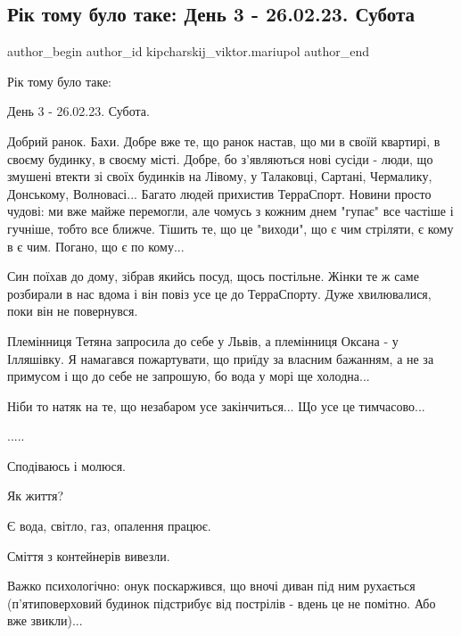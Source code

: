  
 
 
 
 

\subsection{Рік тому було таке: День 3 - 26.02.23. Субота}
\label{sec:26_02_2023.fb.kipcharskij_viktor.mariupol.1.r_k_tomu_bulo_take__}

\ifcmt
 author_begin
   author_id kipcharskij_viktor.mariupol
 author_end
\fi

Рік тому було таке:

День 3 - 26.02.23. Субота.

Добрий ранок. Бахи. Добре вже те, що ранок настав, що ми в своїй квартирі, в
своєму будинку, в своєму місті. Добре, бо з'являються нові сусіди - люди, що
змушені втекти зі своїх будинків на Лівому, у Талаковці, Сартані, Чермалику,
Донському, Волновасі... Багато людей прихистив ТерраСпорт. Новини просто
чудові: ми вже майже перемогли, але чомусь з кожним днем "гупає" все частіше і
гучніше, тобто все ближче. Тішить те, що це "виходи", що є чим стріляти, є кому
в є чим. Погано, що є по кому...

Син поїхав до дому, зібрав якийсь посуд, щось постільне. Жінки те ж саме
розбирали в нас вдома і він повіз усе це до ТерраСпорту. Дуже хвилювалися, поки
він не повернувся.

Племінниця Тетяна запросила до себе у Львів, а племінниця Оксана - у Ілляшівку.
Я намагався пожартувати, що приїду за власним бажанням, а не за примусом і що
до себе не запрошую, бо вода у морі ще холодна...

Ніби то натяк на те, що незабаром усе закінчиться... Що усе це тимчасово...

.....

Сподіваюсь і молюся.

Як життя?

Є вода, світло, газ, опалення працює.

Сміття з контейнерів вивезли.

Важко психологічно: онук поскаржився, що вночі диван під ним рухається
(п'ятиповерховий будинок підстрибує від пострілів - вдень це не помітно. Або
вже звикли)...

